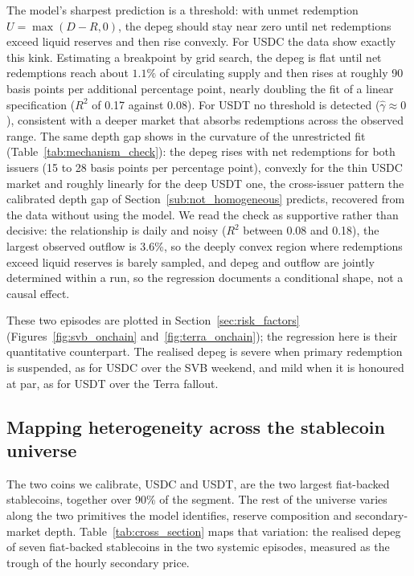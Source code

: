 The model's sharpest prediction is a threshold: with unmet redemption $U = \max(D-R,0)$, the depeg should stay near zero until net redemptions exceed liquid reserves and then rise convexly. For USDC the data show exactly this kink. Estimating a breakpoint by grid search, the depeg is flat until net redemptions reach about $1.1\%$ of circulating supply and then rises at roughly 90 basis points per additional percentage point, nearly doubling the fit of a linear specification ($R^2$ of 0.17 against 0.08). For USDT no threshold is detected ($\hat\gamma \approx 0$), consistent with a deeper market that absorbs redemptions across the observed range. The same depth gap shows in the curvature of the unrestricted fit (Table~\ref{tab:mechanism_check}): the depeg rises with net redemptions for both issuers (15 to 28 basis points per percentage point), convexly for the thin USDC market and roughly linearly for the deep USDT one, the cross-issuer pattern the calibrated depth gap of Section~\ref{sub:not_homogeneous} predicts, recovered from the data without using the model. We read the check as supportive rather than decisive: the relationship is daily and noisy ($R^2$ between 0.08 and 0.18), the largest observed outflow is 3.6\%, so the deeply convex region where redemptions exceed liquid reserves is barely sampled, and depeg and outflow are jointly determined within a run, so the regression documents a conditional shape, not a causal effect.

These two episodes are plotted in Section~\ref{sec:risk_factors} (Figures~\ref{fig:svb_onchain} and~\ref{fig:terra_onchain}); the regression here is their quantitative counterpart. The realised depeg is severe when primary redemption is suspended, as for USDC over the SVB weekend, and mild when it is honoured at par, as for USDT over the Terra fallout.

\subsection{Mapping heterogeneity across the stablecoin universe}\label{sub:cross_section}

The two coins we calibrate, USDC and USDT, are the two largest fiat-backed stablecoins, together over 90\% of the segment. The rest of the universe varies along the two primitives the model identifies, reserve composition and secondary-market depth. Table~\ref{tab:cross_section} maps that variation: the realised depeg of seven fiat-backed stablecoins in the two systemic episodes, measured as the trough of the hourly secondary price.

